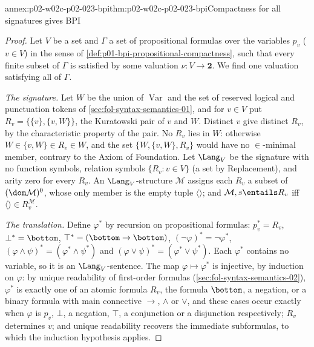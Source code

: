 \begin{annexitem}{annex:p02-w02c-p02-023-bpi}{thm:p02-w02c-p02-023-bpi}{Compactness for all signatures gives BPI}
\begin{proof}
Let \(V\) be a set and \(\Gamma\) a set of propositional formulas over the
variables \(p_v\) (\(v\in V\)) in the sense of
\cref{def:p01-bpi-propositional-compactness}, such that every finite subset
of \(\Gamma\) is satisfied by some valuation \(\nu:V\to\mathbf2\).  We find
one valuation satisfying all of \(\Gamma\).

\emph{The signature.}  Let \(W\) be the union of \(\operatorname{Var}\) and the set of
reserved logical and punctuation tokens of
\cref{sec:fol-syntax-semantics-01}, and for \(v\in V\) put
\(R_v=\{\{v\},\{v,W\}\}\), the Kuratowski pair of \(v\) and \(W\).
Distinct \(v\) give distinct \(R_v\), by the characteristic property of the
pair.  No \(R_v\) lies in \(W\): otherwise \(W\in\{v,W\}\in R_v\in W\), and
the set \(\{W,\{v,W\},R_v\}\) would have no \(\in\)-minimal member,
contrary to the Axiom of Foundation.  Let \(\Lang_V\) be the signature with
no function symbols, relation symbols \(\{R_v:v\in V\}\) (a set by
Replacement), and arity zero for every \(R_v\).  An \(\Lang_V\)-structure
\(\mathcal M\) assigns each \(R_v\) a subset of \((\dom\mathcal M)^0\), whose only
member is the empty tuple \(\langle\rangle\); and \(\mathcal M,s\entails R_v\) iff
\(\langle\rangle\in R_v^{\mathcal M}\).

\emph{The translation.}  Define \(\varphi^{*}\) by recursion on
propositional formulas: \(p_v^{*}=R_v\), \(\bot^{*}=\bottom\),
\(\top^{*}=(\bottom\to\bottom)\), \((\neg\varphi)^{*}=\neg\varphi^{*}\),
\((\varphi\land\psi)^{*}=(\varphi^{*}\land\psi^{*})\) and
\((\varphi\lor\psi)^{*}=(\varphi^{*}\lor\psi^{*})\).  Each
\(\varphi^{*}\) contains no variable, so it is an \(\Lang_V\)-sentence.  The
map \(\varphi\mapsto\varphi^{*}\) is injective, by induction on
\(\varphi\): by unique readability of first-order formulas
(\cref{sec:fol-syntax-semantics-02}), \(\varphi^{*}\) is exactly one of an
atomic formula \(R_v\), the formula \(\bottom\), a negation, or a binary
formula with main connective \(\to\), \(\land\) or \(\lor\), and these cases
occur exactly when \(\varphi\) is \(p_v\), \(\bot\), a negation, \(\top\), a
conjunction or a disjunction respectively; \(R_v\) determines \(v\); and
unique readability recovers the immediate subformulas, to which the
induction hypothesis applies.


\end{proof}
\end{annexitem}
